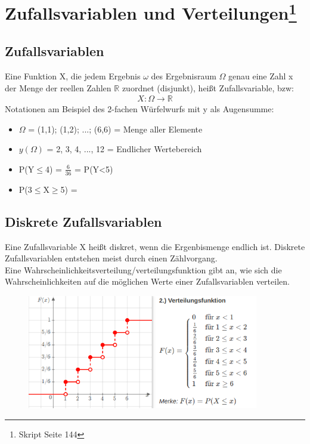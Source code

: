 \documentclass[a4paper,10pt]{scrartcl}
\begin{document}
\section[Zufallsvariablen und Verteilungen]{Zufallsvariablen und Verteilungen\footnote{Skript Seite 144}}
\subsection{Zufallsvariablen}
Eine Funktion X, die jedem Ergebnis $\omega$ des Ergebnisraum $\Omega$ genau eine Zahl x der Menge der reellen Zahlen $\mathbb{R}$
zuordnet (disjunkt), heißt Zufallsvariable, bzw:
\begin{eqnarray*}
X: \Omega \rightarrow \mathbb{R}
\end{eqnarray*}
Notationen am Beispiel des 2-fachen Würfelwurfs mit y als Augensumme:
\begin{itemize}
    \item $\Omega$ = {(1,1); (1,2); ...; (6,6)} = Menge aller Elemente
    \item $y(\Omega)$ = {2, 3, 4, ..., 12} = Endlicher Wertebereich
    \item P(Y$\leq$4) = $\frac{6}{36}$ = P(Y<5)
    \item P(3$\leq$X$\geq$5) = 
\end{itemize}
\subsection{Diskrete Zufallsvariablen}
Eine Zufallsvariable X heißt diskret, wenn die Ergenbismenge endlich ist. Diskrete Zufallsvariablen entstehen meist durch einen Zählvorgang.\\
Eine Wahrscheinlichkeitsverteilung/verteilungsfunktion gibt an, wie sich die Wahrscheinlichkeiten auf die möglichen Werte einer Zufallsvariablen verteilen.
\begin{figure}[h] 
  \centering
    \includegraphics[width=0.9\textwidth]{Verteilungsfunktion.png}
  \label{fig:Bild1}
\end{figure}
\end{document}
